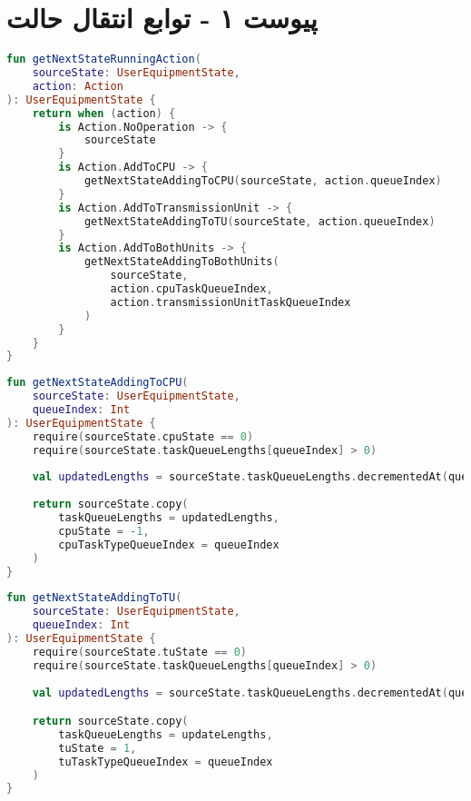\chapter*{پیوست ۱ - توابع انتقال حالت}

\begin{latin}
	\begin{lstlisting}[language=Kotlin, title=\rl{تابع انتقال حالت به ازای کنش ورودی}]
fun getNextStateRunningAction(
    sourceState: UserEquipmentState,
    action: Action
): UserEquipmentState {	
	return when (action) {
		is Action.NoOperation -> {
			sourceState
		}
		is Action.AddToCPU -> {
			getNextStateAddingToCPU(sourceState, action.queueIndex)
		}
		is Action.AddToTransmissionUnit -> {
			getNextStateAddingToTU(sourceState, action.queueIndex)
		}
		is Action.AddToBothUnits -> {
			getNextStateAddingToBothUnits(
			    sourceState,
			    action.cpuTaskQueueIndex,
			    action.transmissionUnitTaskQueueIndex
			)
		}
	}
}
\end{lstlisting}
\end{latin}
\newpage
\begin{latin}
	\begin{lstlisting}[language=Kotlin, title=\rl{تابع انتقال حالت پایه}]
fun getNextStateAddingToCPU(
    sourceState: UserEquipmentState, 
    queueIndex: Int
): UserEquipmentState {
	require(sourceState.cpuState == 0)
	require(sourceState.taskQueueLengths[queueIndex] > 0)
	
	val updatedLengths = sourceState.taskQueueLengths.decrementedAt(queueIndex)
	
	return sourceState.copy(
	    taskQueueLengths = updatedLengths,
	    cpuState = -1,
	    cpuTaskTypeQueueIndex = queueIndex
	)
}
	\end{lstlisting}
\end{latin}

\begin{latin}
	\begin{lstlisting}[language=Kotlin, title=\rl{تابع انتقال حالت با کنش ارسال توسط واحد ارسال}]
fun getNextStateAddingToTU(
    sourceState: UserEquipmentState,
    queueIndex: Int
): UserEquipmentState {
	require(sourceState.tuState == 0)
	require(sourceState.taskQueueLengths[queueIndex] > 0)
	
	val updatedLengths = sourceState.taskQueueLengths.decrementedAt(queueIndex)

	return sourceState.copy(
	    taskQueueLengths = updateLengths,
	    tuState = 1,
	    tuTaskTypeQueueIndex = queueIndex
	)
}
	\end{lstlisting}
\end{latin}

